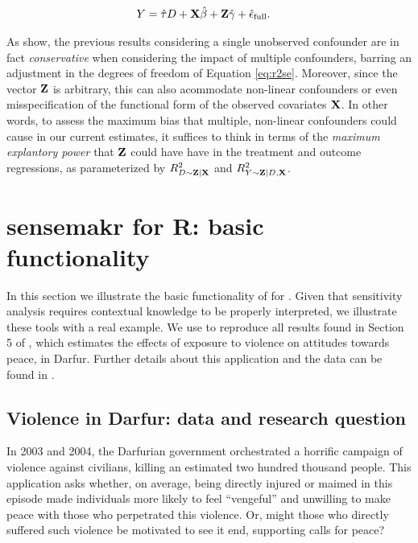\documentclass[
]{jss}
\begin{document}
\noindent  \begin{align}
Y &= \hat{\tau} D + {\bf X} \hat{{\bf \beta}} +  {\bf Z}\hat{{\bf \gamma}} + \hat{\epsilon}_{\text{full}}.  \label{eq:fulleq2}
\end{align}

As \citet{cinelli:jrssb2019} show, the previous results considering a
single unobserved confounder are in fact \emph{conservative} when
considering the impact of multiple confounders, barring an adjustment in
the degrees of freedom of Equation \ref{eq:r2se}. Moreover, since the
vector \({\bf Z}\) is arbitrary, this can also acommodate non-linear
confounders or even misspecification of the functional form of the
observed covariates \({\bf X}\). In other words, to assess the maximum
bias that multiple, non-linear confounders could cause in our current
estimates, it suffices to think in terms of the
\emph{maximum explantory power} that \({\bf Z}\) could have have in the
treatment and outcome regressions, as parameterized by
\(R^2_{D\sim {\bf Z} | {\bf X}}\) and
\(R^2_{Y\sim {\bf Z} |D, {\bf X}}\).

\hypertarget{r-basic}{%
\section{sensemakr for R: basic functionality}\label{r-basic}}

In this section we illustrate the basic functionality of 
for . Given that sensitivity analysis requires contextual
knowledge to be properly interpreted, we illustrate these tools with a
real example. We use  to reproduce all results found in
Section 5 of \citet{cinelli:jrssb2019}, which estimates the effects of
exposure to violence on attitudes towards peace, in Darfur. Further
details about this application and the data can be found in
\citet{hazlett:jcr2019}.

\hypertarget{darfur}{%
\subsection{Violence in Darfur: data and research
question}\label{darfur}}

In 2003 and 2004, the Darfurian government orchestrated a horrific
campaign of violence against civilians, killing an estimated two hundred
thousand people. This application asks whether, on average, being
directly injured or maimed in this episode made individuals more likely
to feel ``vengeful'' and unwilling to make peace with those who
perpetrated this violence. Or, might those who directly suffered such
violence be motivated to see it end, supporting calls for peace?
\end{document}

